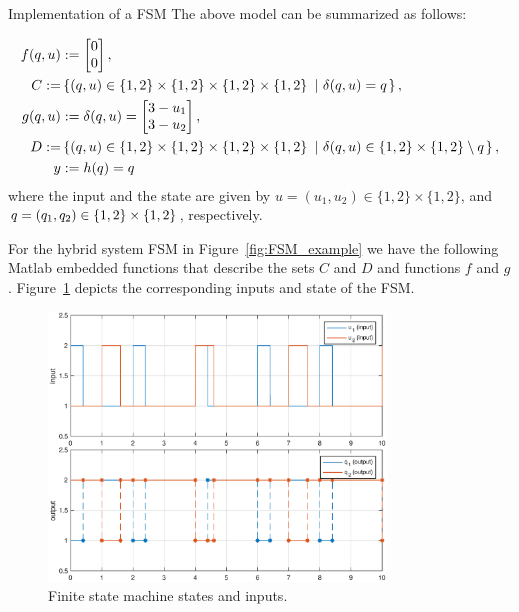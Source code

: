 \begin{example}{Implementation of a FSM}
The above model can be summarized as follows:

\begin{align}\label{eqn:CTdynamicsHcFSM}
f(\xlogic, u)&:= \begin{bmatrix}0\\0\end{bmatrix},\\ 
   C :=& \defset{(\xlogic,u)\in\{1,2\}\times\{1,2\}\times\{1,2\}\times\{1,2\}}{ \delta(\xlogic,u) =  \xlogic},\\
g(\xlogic, u)&:= \delta(\xlogic, u) = \begin{bmatrix}3-u_1\\3-u_2\end{bmatrix}, \\
    D :=& \defset{(\xlogic,u)\in\{1,2\}\times\{1,2\}\times\{1,2\}\times\{1,2\}}{ \delta(\xlogic,u) \in\{1,2\}\times\{1,2\}\setminus \xlogic},\\ 
y &:= h(\xlogic) =\xlogic
\end{align}
where the input and the state are given by $u = (u_1,u_2) \in\{1,2\}\times\{1,2\}$, and $q=(q_1,q_2)\in\{1,2\}\times\{1,2\}$, respectively.

For the hybrid system FSM in Figure~\ref{fig:FSM_example} we have the following Matlab embedded functions that describe the sets $C$ and $D$ and functions $f$ and $g$.
Figure~\ref{fig:FSMresults} depicts the corresponding inputs and state of the FSM.

\begin{figure}[ht]
  \begin{center}
    \includegraphics[width=0.8\textwidth]{figures/Simulink/FSMresults.eps}
   \caption{Finite state machine states and inputs.}
\label{fig:FSMresults}
  \end{center}
\end{figure}


\end{example}
